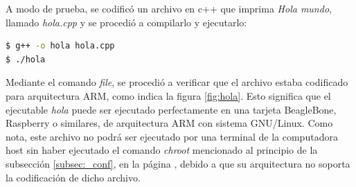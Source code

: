 A modo de prueba, se codificó un archivo en c++ que imprima \textit{Hola mundo}, llamado \textit{hola.cpp} y se procedió a compilarlo y ejecutarlo:

\begin{lstlisting}[language=bash]
$ g++ -o hola hola.cpp
$ ./hola
\end{lstlisting}

\newpage

Mediante el comando \textit{file}\footnotemark, se procedió a verificar que el archivo estaba codificado para arquitectura ARM, como indica la figura \ref{fig:hola}. Esto significa que el ejecutable \textit{hola} puede ser ejecutado perfectamente en una tarjeta BeagleBone, Raspberry o similares, de arquitectura ARM con sistema GNU/Linux. Como nota, este archivo no podrá ser ejecutado por una terminal de la computadora host sin haber ejecutado el comando \textit{chroot} mencionado al principio de la subsección \ref{subsec:_conf}, en la página \pageref{subsec:_conf}, debido a que su arquitectura no soporta la codificación de dicho archivo.

%